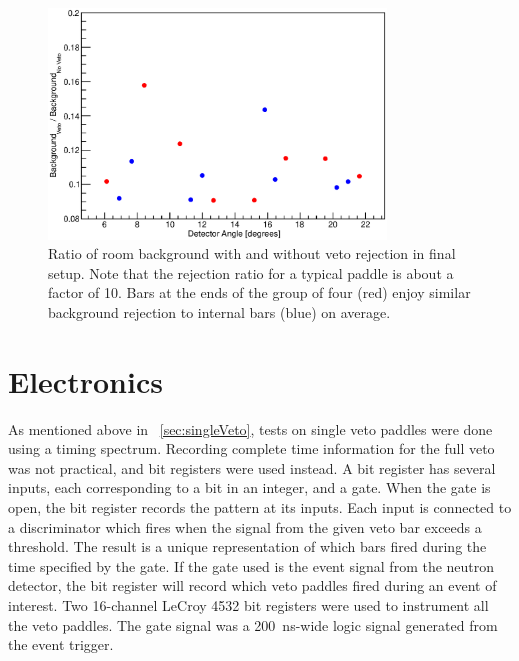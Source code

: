 \begin{figure}[!htbp]
\centering
\includegraphics[width=0.8\textwidth]{figures/bkgdRejection_new.eps}
\caption{Ratio of room background with and without veto rejection in final setup.  Note that the rejection ratio for a typical paddle is about a factor of 10.  Bars at the ends of the group of four (red) enjoy similar background rejection to internal bars (blue) on average.}
\label{fig:finalBackground}
\end{figure}

\section{Electronics}

As mentioned above in {\sect}~\ref{sec:singleVeto}, tests on single veto paddles were done using a timing spectrum.  Recording complete time information for the full veto was not practical, and bit registers were used instead.  A bit register has several inputs, each corresponding to a bit in an integer, and a gate.  When the gate is open, the bit register records the pattern at its inputs.  Each input is connected to a discriminator which fires when the signal from the given veto bar exceeds a threshold.  The result is a unique representation of which bars fired during the time specified by the gate.  If the gate used is the event signal from the neutron detector, the bit register will record which veto paddles fired during an event of interest.  Two 16-channel LeCroy 4532 bit registers were used to instrument all the veto paddles.  The gate signal was a 200~ns-wide logic signal generated from the event trigger.

